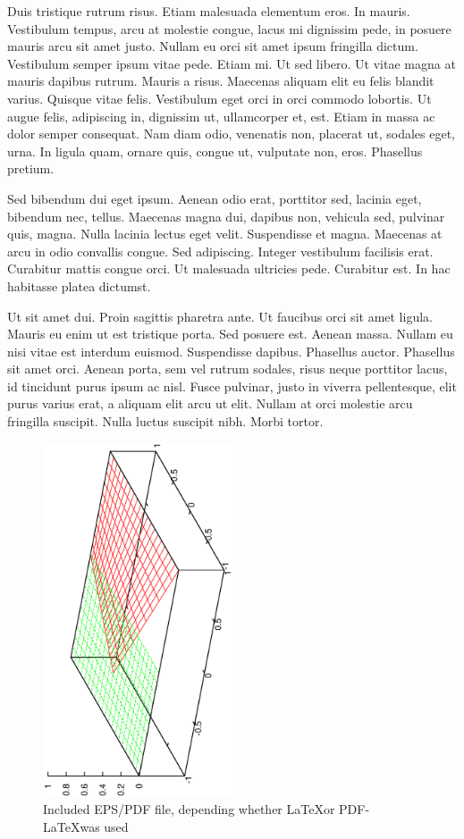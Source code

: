 Duis tristique rutrum risus. Etiam malesuada elementum eros. In mauris. Vestibulum tempus, arcu at molestie congue, lacus mi dignissim pede, in posuere mauris arcu sit amet justo. Nullam eu orci sit amet ipsum fringilla dictum. Vestibulum semper ipsum vitae pede. Etiam mi. Ut sed libero. Ut vitae magna at mauris dapibus rutrum. Mauris a risus. Maecenas aliquam elit eu felis blandit varius. Quisque vitae felis. Vestibulum eget orci in orci commodo lobortis. Ut augue felis, adipiscing in, dignissim ut, ullamcorper et, est. Etiam in massa ac dolor semper consequat. Nam diam odio, venenatis non, placerat ut, sodales eget, urna. In ligula quam, ornare quis, congue ut, vulputate non, eros. Phasellus pretium.

Sed bibendum dui eget ipsum. Aenean odio erat, porttitor sed, lacinia eget, bibendum nec, tellus. Maecenas magna dui, dapibus non, vehicula sed, pulvinar quis, magna. Nulla lacinia lectus eget velit. Suspendisse et magna. Maecenas at arcu in odio convallis congue. Sed adipiscing. Integer vestibulum facilisis erat. Curabitur mattis congue orci. Ut malesuada ultricies pede. Curabitur est. In hac habitasse platea dictumst.

Ut sit amet dui. Proin sagittis pharetra ante. Ut faucibus orci sit amet ligula. Mauris eu enim ut est tristique porta. Sed posuere est. Aenean massa. Nullam eu nisi vitae est interdum euismod. Suspendisse dapibus. Phasellus auctor. Phasellus sit amet orci. Aenean porta, sem vel rutrum sodales, risus neque porttitor lacus, id tincidunt purus ipsum ac nisl. Fusce pulvinar, justo in viverra pellentesque, elit purus varius erat, a aliquam elit arcu ut elit. Nullam at orci molestie arcu fringilla suscipit. Nulla luctus suscipit nibh. Morbi tortor.


\begin{figure}
\begin{center}
\includegraphics[angle=-90,width=0.5\textwidth]{figures/xfem_N1}
  \caption{Included EPS/PDF file, depending whether \LaTeX or PDF-\LaTeX was used}
\end{center}
\end{figure}

